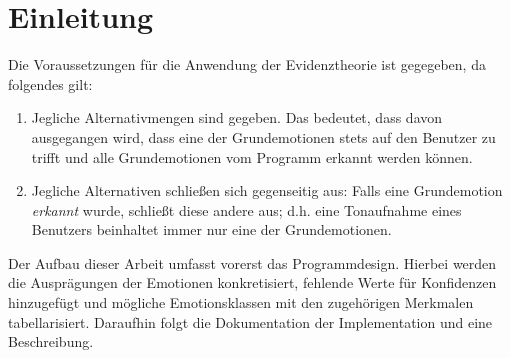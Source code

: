 \chapter{Einleitung}
Die Voraussetzungen für die Anwendung der Evidenztheorie ist gegegeben, da folgendes gilt:

\begin{enumerate}
  \item Jegliche Alternativmengen sind gegeben. Das bedeutet, dass davon ausgegangen wird, dass eine der Grundemotionen stets auf den Benutzer zu trifft und alle Grundemotionen vom Programm erkannt werden können. 
  \item Jegliche Alternativen schließen sich gegenseitig aus: Falls eine Grundemotion \textit{erkannt} wurde, schließt diese andere aus; d.h. eine Tonaufnahme eines Benutzers beinhaltet immer nur eine der Grundemotionen.
\end{enumerate}

Der Aufbau dieser Arbeit umfasst vorerst das Programmdesign. Hierbei werden die Ausprägungen der Emotionen konkretisiert, fehlende Werte für Konfidenzen hinzugefügt und mögliche Emotionsklassen mit den zugehörigen Merkmalen tabellarisiert. Daraufhin folgt die Dokumentation der Implementation und eine Beschreibung.